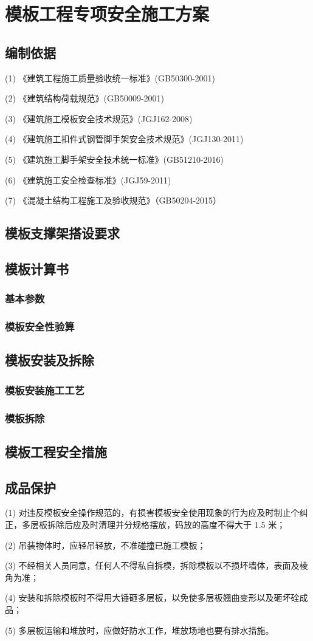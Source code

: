 \section{模板工程专项安全施工方案}
\subsection{编制依据}

(1) 《建筑工程施工质量验收统一标准》(GB50300-2001)

(2) 《建筑结构荷载规范》(GB50009-2001)

(3) 《建筑施工模板安全技术规范》(JGJ162-2008)

(4) 《建筑施工扣件式钢管脚手架安全技术规范》(JGJ130-2011)

(5) 《建筑施工脚手架安全技术统一标准》(GB51210-2016)

(6) 《建筑施工安全检查标准》(JGJ59-2011)

(7) 《混凝土结构工程施工及验收规范》（GB50204-2015） 

\subsection{模板支撑架搭设要求}

\subsection{模板计算书}
\subsubsection{基本参数}

\subsubsection{模板安全性验算}

\subsection{模板安装及拆除}
\subsubsection{模板安装施工工艺}

\subsubsection{模板拆除}

\subsection{模板工程安全措施}

\subsection{成品保护}

(1) 对违反模板安全操作规范的，有损害模板安全使用现象的行为应及时制止个纠正，多层板拆除后应及时清理并分规格摆放，码放的高度不得大于 1.5 米；

(2) 吊装物体时，应轻吊轻放，不准碰撞已施工模板；

(3) 不经相关人员同意，任何人不得私自拆模，拆除模板以不损坏墙体，表面及棱角为准；

(4) 安装和拆除模板时不得用大锤砸多层板，以免使多层板翘曲变形以及砸坏硂成品；

(5) 多层板运输和堆放时，应做好防水工作，堆放场地也要有排水措施。

